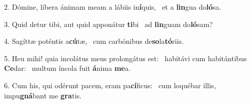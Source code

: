 2. Dómine, líbera ánimam meam a lábiis in\textbf{í}quis, \ast\  et a \textbf{lin}gua do\textbf{ló}sa.\

3. Quid detur tibi, aut quid apponátur \textbf{ti}bi \ast\  ad \textbf{lin}guam do\textbf{ló}sam?\

4. Sagíttæ poténtis a\textbf{cú}tæ, \ast\  cum carbónibus de\textbf{so}la\textbf{tó}riis.\

5. Heu mihi! quia incolátus meus prolongátus est: \dag\  habitávi cum habitántibus \textbf{Ce}dar: \ast\  multum íncola fuit \textbf{á}nima \textbf{me}a.\

6. Cum his, qui odérunt pacem, eram pa\textbf{cí}ficus: \ast\  cum loquébar illis, impu\textbf{gná}bant me \textbf{gra}tis.\

